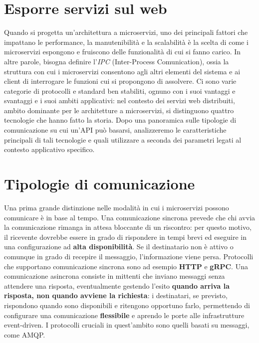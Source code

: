 \section{Esporre servizi sul web}

Quando si progetta un'architettura a microservizi, uno dei principali fattori che impattano le performance, la manutenibilità e la scalabilità è la scelta di come i microservizi espongono e fruiscono delle funzionalità di cui si fanno carico. In altre parole, bisogna definire l'\emph{IPC} (Inter-Process Comunication), ossia la struttura con cui i microservizi consentono agli altri elementi del sistema e ai client di interrogare le funzioni cui si propongono di assolvere.
Ci sono varie categorie di protocolli e standard ben stabiliti, ognuno con i suoi vantaggi e svantaggi e i suoi ambiti applicativi: nel contesto dei servizi web distribuiti, ambito dominante per le architetture a microservizi, si distinguono quattro tecnologie che hanno fatto la storia. Dopo una panoramica sulle tipologie di comunicazione su cui un'API può basarsi, analizzeremo le caratteristiche principali di tali tecnologie e quali utilizzare a seconda dei parametri legati al contesto applicativo specifico.

\section{Tipologie di comunicazione}

Una prima grande distinzione nelle modalità in cui i microservizi possono comunicare è in base al tempo.
Una comunicazione sincrona prevede che chi avvia la comunicazione rimanga in attesa bloccante di un riscontro: per questo motivo, il ricevente dovrebbe essere in grado di rispondere in tempi brevi ed eseguire in una configurazione ad \textbf{alta disponibilità}. Se il destinatario non è attivo o comunque in grado di recepire il messaggio, l'informazione viene persa. Protocolli che supportano comunicazione sincrona sono ad esempio \textbf{HTTP} e \textbf{gRPC}.
Una comunicazione asincrona consiste in mittenti che inviano messaggi senza attendere una risposta, eventualmente gestendo l'esito \textbf{quando arriva la risposta, non quando avviene la richiesta}: i destinatari, se previsto, rispondono quando sono disponibili e ritengono opportuno farlo, permettendo di configurare una comunicazione \textbf{flessibile} e aprendo le porte alle infrastrutture event-driven. I protocolli cruciali in quest'ambito sono quelli basati su messaggi, come AMQP.


